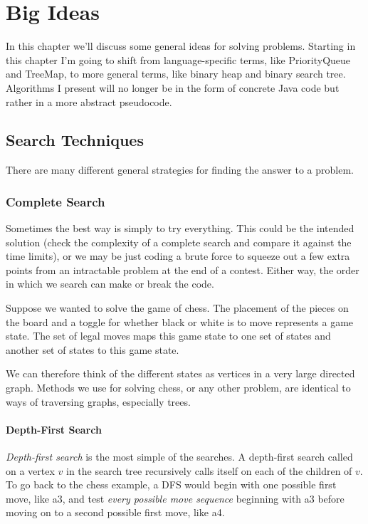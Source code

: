\documentclass[11pt]{book}
\begin{document}
\chapter{Big Ideas}

In this chapter we'll discuss some general ideas for solving problems. Starting in this chapter I'm going to shift from language-specific terms, like PriorityQueue and TreeMap, to more general terms, like binary heap and binary search tree. Algorithms I present will no longer be in the form of concrete Java code but rather in a more abstract pseudocode.

\section{Search Techniques}

There are many different general strategies for finding the answer to a problem.

\subsection{Complete Search}

Sometimes the best way is simply to try everything. This could be the intended solution (check the complexity of a complete search and compare it against the time limits), or we may be just coding a brute force to squeeze out a few extra points from an intractable problem at the end of a contest. Either way, the order in which we search can make or break the code.

Suppose we wanted to solve the game of chess. The placement of the pieces on the board and a toggle for whether black or white is to move represents a game state. The set of legal moves maps this game state to one set of states and another set of states to this game state.

We can therefore think of the different states as vertices in a very large directed graph. Methods we use for solving chess, or any other problem, are identical to ways of traversing graphs, especially trees.

\subsubsection{Depth-First Search}

\textit{Depth-first search} is the most simple of the searches. A depth-first search called on a vertex $v$ in the search tree recursively calls itself on each of the children of $v$. To go back to the chess example, a DFS would begin with one possible first move, like a3, and test \textit{every possible move sequence} beginning with a3 before moving on to a second possible first move, like a4.
\end{document}
